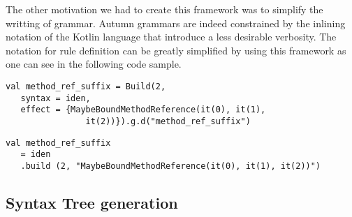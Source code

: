 	\bigskip

	The other motivation we had to create this framework was to simplify the writting of grammar. Autumn grammars are indeed constrained by the inlining notation of the Kotlin language that introduce a less desirable verbosity. The notation for rule definition can be greatly simplified by using this framework as one can see in the following code sample. 

	\begin{tcolorbox}
	\begin{lstlisting}
val method_ref_suffix = Build(2,
   syntax = iden,
   effect = {MaybeBoundMethodReference(it(0), it(1), 
   				it(2))}).g.d("method_ref_suffix")
	\end{lstlisting}
    \end{tcolorbox}
    \begin{tcolorbox}
	\begin{lstlisting}
val method_ref_suffix
   = iden
   .build (2, "MaybeBoundMethodReference(it(0), it(1), it(2))")

	\end{lstlisting}
    \end{tcolorbox}



% 


%
		\subsection{Syntax Tree generation}
%
	
